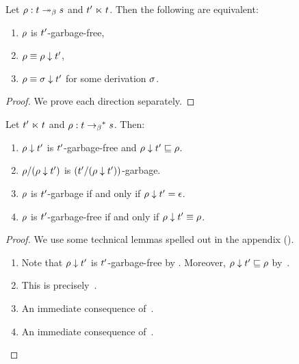 \begin{proposition}
Let $\rho : t \mathrel{\twoheadrightarrow_\beta} s$ and $t' \mathrel{\ltimes} t$.
Then the following are equivalent:
\begin{enumerate}
\item $\rho$ is $t'$-garbage-free,
\item $\rho \equiv \rho \downarrow t'$,
\item $\rho \equiv \sigma \downarrow t'$ for some derivation $\sigma$.
\end{enumerate}
\end{proposition}
\begin{proof}
We prove each direction separately. 
\end{proof}


\begin{proposition}
Let $t' \mathrel{\ltimes} t$ and $\rho : t \mathrel{\to_\beta}^* s$. Then:
\begin{enumerate}
\item $\rho \downarrow t'$ is $t'$-garbage-free and $\rho \downarrow t' \sqsubseteq \rho$.
\item $\rho/(\rho \downarrow t')$ is $(t'/(\rho \downarrow t'))$-garbage.
\item $\rho$ is $t'$-garbage if and only if $\rho \downarrow t' = \epsilon$.
\item $\rho$ is $t'$-garbage-free if and only if $\rho \downarrow t' \equiv \rho$.
\end{enumerate}
\end{proposition}
\begin{proof}
We use some technical lemmas spelled out in the appendix ().
\begin{enumerate}
\item  Note that $\rho \downarrow t'$ is $t'$-garbage-free by
  .
  Moreover, $\rho \downarrow t' \sqsubseteq \rho$ by~.
\item This is precisely~.
\item An immediate consequence of~.
\item An immediate consequence of~.
\end{enumerate}
\end{proof}

